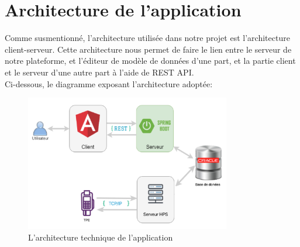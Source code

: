 \section{Architecture de l'application}
Comme susmentionné, l'architecture utilisée dans notre projet est l'architecture client-serveur.
Cette architecture nous permet de faire le lien entre le serveur de notre plateforme, et  l’éditeur de modèle de données d’une part, et la partie client et le serveur d’une autre part à l'aide de REST API.\\
Ci-dessous, le diagramme exposant l'architecture adoptée:
\begin{figure}[h!]  
 \centering
    \includegraphics[width=0.8\textwidth]{chapitre3/Figures/archGenral.png}
  \caption{L'architecture technique de l'application}
\end{figure}
